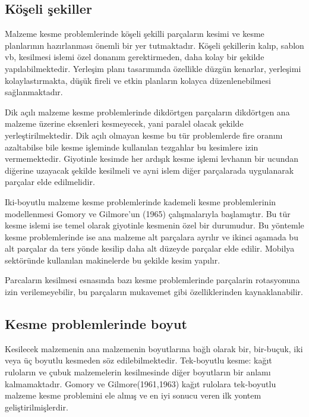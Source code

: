 \documentclass[]{book}
\begin{document}
\hypertarget{koseli-sekiller}{%
\subsection{Köşeli şekiller}\label{koseli-sekiller}}

Malzeme kesme problemlerinde köşeli şekilli parçaların kesimi ve kesme planlarının hazırlanması önemli bir yer tutmaktadır. Köşeli şekillerin kalıp, sablon vb, kesilmesi islemi özel donanım gerektirmeden, daha kolay bir şekilde yapılabilmektedir. Yerleşim planı tasarımında özellikle düzgün kenarlar, yerleşimi kolaylastırmakta, düşük fireli ve etkin planların kolayca düzenlenebilmesi sağlanmaktadır.

Dik açılı malzeme kesme problemlerinde dikdörtgen parçaların dikdörtgen ana malzeme üzerine eksenleri kesmeyecek, yani paralel olacak şekilde yerleştirilmektedir. Dik açılı olmayan kesme bu tür problemlerde fire oranını azaltabilse bile kesme işleminde kullanılan tezgahlar bu kesimlere izin vermemektedir. Giyotinle kesimde her ardışık kesme işlemi levhanın bir ucundan diğerine uzayacak şekilde kesilmeli ve ayni islem diğer parçalarada uygulanarak parçalar elde edilmelidir.

Iki-boyutlu malzeme kesme problemlerinde kademeli kesme problemlerinin modellenmesi Gomory ve Gilmore'un (1965) çalışmalarıyla başlamıştır. Bu tür kesme islemi ise temel olarak giyotinle kesmenin özel bir durumudur. Bu yöntemle kesme problemlerinde ise ana malzeme alt parçalara ayrılır ve ikinci aşamada bu alt parçalar da ters yönde kesilip daha alt düzeyde parçalar elde edilir. Mobilya sektöründe kullanılan makinelerde bu şekilde kesim yapılır.

Parcaların kesilmesi esnasında bazı kesme problemlerinde parçalarin rotasyonuna izin verilemeyebilir, bu parçaların mukavemet gibi özelliklerinden kaynaklanabilir.

\hypertarget{kesme-problemlerinde-boyut}{%
\subsection{Kesme problemlerinde boyut}\label{kesme-problemlerinde-boyut}}

Kesilecek malzemenin ana malzemenin boyutlarına bağlı olarak bir, bir-buçuk, iki veya üç boyutlu kesmeden söz edilebilmektedir.
Tek-boyutlu kesme: kağıt ruloların ve çubuk malzemelerin kesilmesinde diğer boyutların bir anlamı kalmamaktadır. Gomory ve Gilmore(1961,1963) kağıt rulolara tek-boyutlu malzeme kesme problemini ele almış ve en iyi sonucu veren ilk yontem geliştirilmişlerdir.
\end{document}
